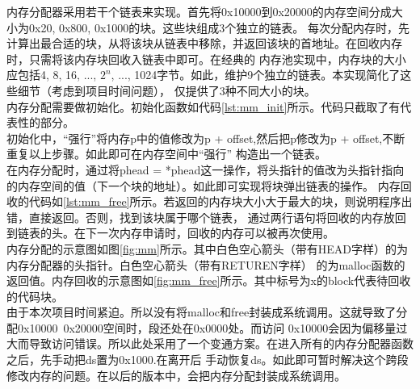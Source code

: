 \documentclass[a4paper]{article}
\begin{document}
    内存分配器采用若干个链表来实现。首先将0x10000到0x20000的内存空间分成大小为0x20, 0x800, 0x1000的块。这些块组成3个独立的链表。
    每次分配内存时，先计算出最合适的块，从将该块从链表中移除，并返回该块的首地址。在回收内存时，只需将该内存块回收入链表中即可。在经典的
    内存池实现中，内存块的大小应包括4, 8, 16, ..., $2^n$, ..., 1024字节。如此，维护9个独立的链表。本实现简化了这些细节（考虑到项目时间问题），
    仅提供了3种不同大小的块。\\ 

    内存分配需要做初始化。初始化函数如代码\ref{lst:mm_init}所示。代码只截取了有代表性的部分。\\ 

    初始化中，``强行''将内存p中的值修改为p + offset,然后把p修改为p + offset,不断重复以上步骤。如此即可在内存空间中``强行''
    构造出一个链表。\\ 

    在内存分配时，通过将phead = *phead这一操作，将头指针的值改为头指针指向的内存空间的值（下一个块的地址）。如此即可实现将块弹出链表的操作。
    内存回收的代码如\ref{lst:mm_free}所示。若返回的内存块大小大于最大的块，则说明程序出错，直接返回。否则，找到该块属于哪个链表，
    通过两行语句将回收的内存放回到链表的头。在下一次内存申请时，回收的内存可以被再次使用。\\ 
    
    内存分配的示意图如图\ref{fig:mm}所示。其中白色空心箭头（带有HEAD字样）的为内存分配器的头指针。白色空心箭头（带有RETUREN字样）
    的为malloc函数的返回值。内存回收的示意图如\ref{fig:mm_free}所示。其中标号为x的block代表待回收的代码块。\\ 

    由于本次项目时间紧迫。所以没有将malloc和free封装成系统调用。这就导致了分配0x10000~0x20000空间时，段还处在0x0000处。而访问
    0x10000会因为偏移量过大而导致访问错误。所以此处采用了一个变通方案。在进入所有的内存分配器函数之后，先手动把ds置为0x1000.在离开后
    手动恢复ds。如此即可暂时解决这个跨段修改内存的问题。在以后的版本中，会把内存分配封装成系统调用。
    
\end{document}
